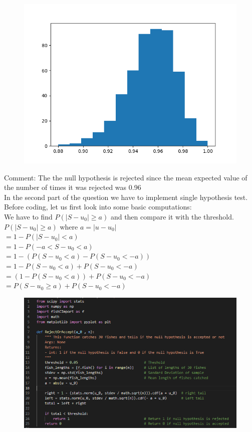 \documentclass[answers]{exam}
\begin{document}
\begin{framed}
\begin{figure}[H] %
    \centering
    \includegraphics[width= 0.5 \textwidth]{Q5.2_histogram_1.png}
\end{figure}

Comment: The the null hypothesis is rejected since the mean expected value of the number of times it was rejected was 0.96 \\

In the second part of the question we have to implement single hypothesis test. Before coding, let us first look into some basic computations: \\ 
We have to find $P( | S  - u_0 | \geq a )$ and then compare it with the threshold. \\
$P( | S  - u_0 | \geq a )$ where $a = | u - u_0|$ \\
$= 1 - P( | S  - u_0 | < a )$\\
$= 1 - P( - a < S - u_0 < a)$\\
$= 1 - (P(S - u_0 < a) -  P(S - u_0 < -a))$\\
$= 1 - P(S - u_0 < a) +  P(S - u_0 < -a)$\\
$= (1 - P(S - u_0 < a)) +  P(S - u_0 < -a)$\\
$=  P(S - u_0 \geq a) +  P(S - u_0 < -a)$\\

\begin{figure}[H] %
    \centering
    \includegraphics[width= 1 \textwidth]{Q5.2_code_3.PNG}
\end{figure}


\end{framed}
\end{document}
